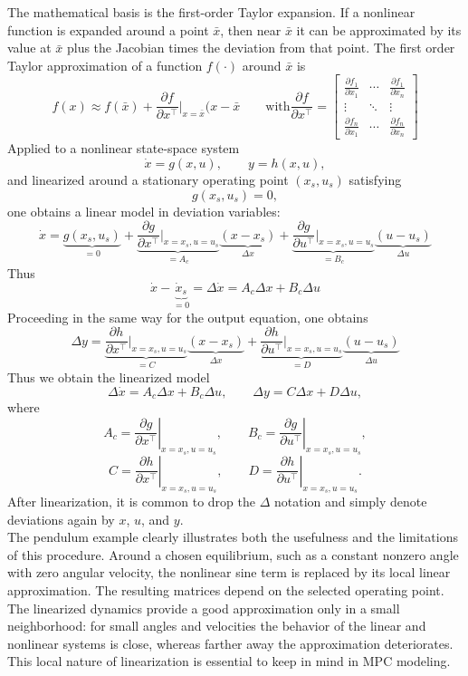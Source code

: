 The mathematical basis is the first-order Taylor expansion. If a nonlinear function is expanded around a point $\bar{x}$, then near $\bar{x}$ it can be approximated by its value at $\bar{x}$ plus the Jacobian times the deviation from that point. The first order Taylor approximation of a function $f(\cdot)$ around $\bar{x}$ is
$$f(x) \approx f(\bar{x}) + \frac{\partial f}{\partial x^\top}\bigg|_{x=\bar{x}} (x-\bar{x} \qquad \text{with} \frac{\partial f}{\partial x^\top} = \begin{bmatrix}
\frac{\partial f_1}{\partial x_1} & \cdots & \frac{\partial f_1}{\partial x_n} \\
\vdots & \ddots & \vdots \\
\frac{\partial f_n}{\partial x_1} & \cdots & \frac{\partial f_n}{\partial x_n}
\end{bmatrix}$$
Applied to a nonlinear state-space system
\[
\dot{x} = g(x,u), \qquad y = h(x,u),
\]
and linearized around a stationary operating point $(x_s,u_s)$ satisfying
\[
g(x_s,u_s)=0,
\]
one obtains a linear model in deviation variables:
$$ \dot{x} = \underbrace{g(x_s,u_s)}_{=0} + \underbrace{\frac{\partial g}{\partial x^\top}\bigg|_{x=x_s,u=u_s}}_{=A_c} \underbrace{(x-x_s)}_{\Delta x} + \underbrace{\frac{\partial g}{\partial u^\top}\bigg|_{x=x_s,u=u_s}}_{=B_c} \underbrace{(u-u_s)}_{\Delta u} $$
Thus
$$\dot{x} - \underbrace{\dot{x}_s}_{=0} = \Delta \dot{x} = A_c \Delta x + B_c \Delta u$$
Proceeding in the same way for the output equation, one obtains
$$\Delta y = \underbrace{\frac{\partial h}{\partial x^\top}\bigg|_{x=x_s,u=u_s}}_{=C} \underbrace{(x-x_s)}_{\Delta x} + \underbrace{\frac{\partial h}{\partial u^\top}\bigg|_{x=x_s,u=u_s}}_{=D} \underbrace{(u-u_s)}_{\Delta u}$$
Thus we obtain the linearized model
\[
\Delta \dot{x} = A_c \Delta x + B_c \Delta u, \qquad \Delta y = C \Delta x + D \Delta u,
\]
where
\[
A_c = \left.\frac{\partial g}{\partial x^\top}\right|_{x=x_s,u=u_s},
\qquad
B_c = \left.\frac{\partial g}{\partial u^\top}\right|_{x=x_s,u=u_s},
\]
\[
C = \left.\frac{\partial h}{\partial x^\top}\right|_{x=x_s,u=u_s},
\qquad
D = \left.\frac{\partial h}{\partial u^\top}\right|_{x=x_s,u=u_s}.
\]
After linearization, it is common to drop the $\Delta$ notation and simply denote deviations again by $x$, $u$, and $y$.\\

The pendulum example clearly illustrates both the usefulness and the limitations of this procedure. Around a chosen equilibrium, such as a constant nonzero angle with zero angular velocity, the nonlinear sine term is replaced by its local linear approximation. The resulting matrices depend on the selected operating point. The linearized dynamics provide a good approximation only in a small neighborhood: for small angles and velocities the behavior of the linear and nonlinear systems is close, whereas farther away the approximation deteriorates. This local nature of linearization is essential to keep in mind in MPC modeling.

